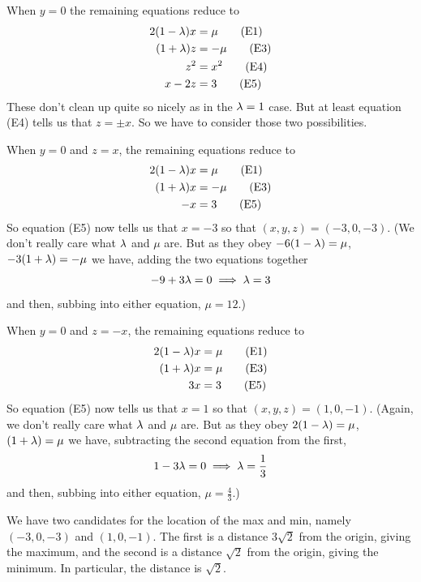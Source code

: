 \begin{eg}
\medskip
{} 
When $y=0$ the remaining equations reduce
to
\begin{alignat*}{3}
2(1-\lambda)x &= \mu  \tag{E1} \\
(1+\lambda)z&= -\mu  \tag{E3} \\
z^2&=x^2 \tag{E4} \\
x-2z&=3 \tag{E5}
\end{alignat*}
These don't clean up quite so nicely as in the $\lambda=1$ case.
But at least equation (E4) tells us that $z=\pm x$. So we have
to consider those two possibilities.

\medskip
{} 
When $y=0$ and $z=x$, the remaining equations reduce to 
\begin{alignat*}{3}
2(1-\lambda)x &= \mu  \tag{E1} \\
(1+\lambda)x&= -\mu  \tag{E3} \\
-x&=3 \tag{E5}
\end{alignat*}
So equation (E5) now tells us that $x=-3$ so that
$
(x,y,z)=(-3,0,-3)
$.
(We don't really care what $\lambda$ and $\mu$ are. But as they
obey $-6(1-\lambda)=\mu$, $-3(1+\lambda)=-\mu$ we have, adding the two equations
together
\begin{equation*}
-9+3\lambda=0 \implies \lambda=3
\end{equation*}
and then, subbing into either equation, $\mu=12$.)

\medskip
{} 
When $y=0$ and $z=-x$, the 
remaining equations reduce to
\begin{alignat*}{3}
2(1-\lambda)x &= \mu  \tag{E1} \\
(1+\lambda)x&= \mu  \tag{E3} \\
3x&=3 \tag{E5}
\end{alignat*}
So equation (E5) now tells us that $x=1$ so that
$
(x,y,z)=(1,0,-1)
$.
(Again, we don't really care what $\lambda$ and $\mu$ are. But as they
obey $2(1-\lambda)=\mu$, $(1+\lambda)=\mu$ we have, subtracting the second 
equation from the first, 
\begin{equation*}
1-3\lambda=0
\implies \lambda=\frac{1}{3}
\end{equation*}
and then, subbing into either equation, $\mu=\frac{4}{3}$.)

\medskip
{} We have two candidates for the location
of the max and min, namely $(-3,0,-3)$ and $(1,0,-1)$. The first is a distance
$3\sqrt{2}$ from the origin, giving the maximum, and the second is a 
distance $\sqrt{2}$ from the origin, giving the minimum. In particular,
the distance is $\sqrt{2}$.

\end{eg}

